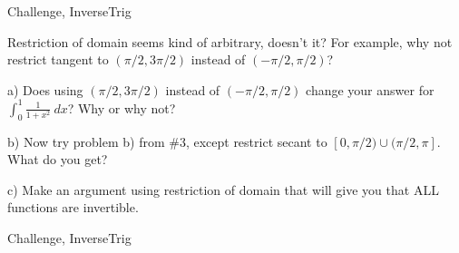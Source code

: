 \begin{tagblock}{Challenge, InverseTrig}
\begin{question}[CHALLENGE!!!]

Restriction of domain seems kind of arbitrary, doesn't it? For example, why not restrict tangent to $(\pi/2,3\pi/2)$ instead of $(-\pi/2,\pi/2)$?

\bigskip

a) Does using $(\pi/2,3\pi/2)$ instead of $(-\pi/2,\pi/2)$ change your answer for $\displaystyle\int_0^1\frac 1 {1+x^2} \ dx$? Why or why not? 

\bigskip

b) Now try problem b) from \#3, except restrict secant to $[0,\pi/2)\cup (\pi/2,\pi]$. What do you get?

\bigskip

c) Make an argument using restriction of domain that will give you that ALL functions are invertible. 
	
	
\begin{tags}
	    Challenge, InverseTrig
\end{tags}
	
\begin{diary}
\end{diary}
		
\begin{solution}
       
\end{solution}

\end{question}

\end{tagblock}


